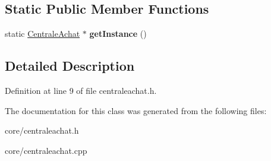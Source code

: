 \subsection*{Static Public Member Functions}
\begin{DoxyCompactItemize}
\item 
\hypertarget{classcore_1_1_centrale_achat_ace0934154a215fc3fc8361c204a73f25}{
static \hyperlink{classcore_1_1_centrale_achat}{CentraleAchat} $\ast$ {\bfseries getInstance} ()}
\label{db/d46/classcore_1_1_centrale_achat_ace0934154a215fc3fc8361c204a73f25}

\end{DoxyCompactItemize}


\subsection{Detailed Description}


Definition at line 9 of file centraleachat.h.



The documentation for this class was generated from the following files:\begin{DoxyCompactItemize}
\item 
core/centraleachat.h\item 
core/centraleachat.cpp\end{DoxyCompactItemize}
